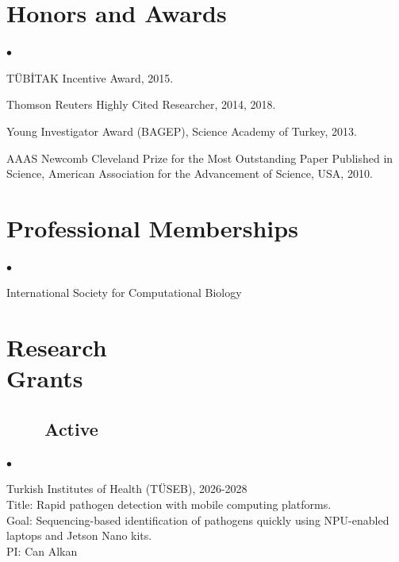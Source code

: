 \documentclass[margin,line]{res}
\newenvironment{list2}{
  \begin{list}{$\bullet$}{%
      \setlength{\itemsep}{0.1cm}
      \setlength{\parsep}{0in} \setlength{\parskip}{0in}
      \setlength{\topsep}{0in} \setlength{\partopsep}{0in} 
      \setlength{\leftmargin}{0.2in}}}{\end{list}}
\newenvironment{list4}{
  \begin{list}{$\bullet$}{%
      \setlength{\itemsep}{0cm}
      \setlength{\parsep}{0in} \setlength{\parskip}{0in}
      \setlength{\topsep}{0in} \setlength{\partopsep}{0in} 
      \setlength{\leftmargin}{0.2in}}}{\end{list}}
\begin{document}
\begin{resume}
\clearpage
          
\vspace*{-.2cm}
    
\section{\sc Honors and Awards} 
    \begin{list4}
        \item TÜBİTAK Incentive Award, 2015.
        \item Thomson Reuters Highly Cited Researcher, 2014, 2018.
        \item Young Investigator Award (BAGEP), Science Academy of Turkey, 2013.
        \item AAAS Newcomb Cleveland Prize for the Most Outstanding Paper Published in Science, American Association for the Advancement of Science, USA, 2010.
    \end{list4}
          

\vspace*{-.2cm}

\section{\sc Professional Memberships}
    \begin{list4}
        \item International Society for Computational Biology%
    \end{list4}


\section{\sc Research \\ Grants}

\vspace{-0.4cm}

    \subsection{\small \sc ~~~~Active}
  \begin{list2}
    \item 
    Turkish Institutes of Health (TÜSEB), 2026-2028\\
    Title:  Rapid pathogen detection with mobile computing platforms.\\
    Goal: Sequencing-based identification of pathogens quickly using NPU-enabled laptops and Jetson Nano kits.\\ 
    PI: Can Alkan
    



\end{list2}
\end{resume}
\end{document}
